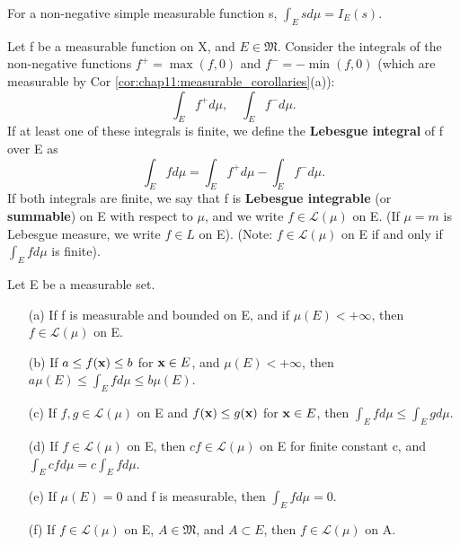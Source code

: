 \begin{remark}
  \label{rem:chap11:integral_simple_consistency}
  For a non-negative simple measurable function s, $\int_E s d\mu = I_E(s)$.
\end{remark}



\begin{definition}
  \label{def:chap11:integral_general}
  Let f be a measurable function on X, and $E \in \mathfrak{M}$.
  Consider the integrals of the non-negative functions $f^+ = \max(f,
  0)$ and $f^- = -\min(f, 0)$ (which are measurable by Cor
  \ref{cor:chap11:measurable_corollaries}(a)):
  \[
    \int_E f^+ d\mu, \quad \int_E f^- d\mu.
  \]
  If at least one of these integrals is finite, we define the
  \textbf{Lebesgue integral} of f over E as
  \[
    \int_E f d\mu = \int_E f^+ d\mu - \int_E f^- d\mu.
  \]
  If both integrals are finite, we say that f is \textbf{Lebesgue
  integrable} (or \textbf{summable}) on E with respect to $\mu$, and
  we write $f \in \mathcal{L}(\mu)$ on E. (If $\mu=m$ is Lebesgue
  measure, we write $f \in L$ on E).
  (Note: $f \in \mathcal{L}(\mu)$ on E if and only if $\int_E f d\mu$
  is finite).
\end{definition}

\begin{remark}
  \label{rem:chap11:integral_properties}
  Let E be a measurable set.
  \begin{itemize}
    \item[(a)] If f is measurable and bounded on E, and if $\mu(E) <
      +\infty$, then $f \in \mathcal{L}(\mu)$ on E.
    \item[(b)] If $a \le f(\mathbf{x}) \le b$ for $\mathbf{x} \in E$, and
      $\mu(E) < +\infty$, then $a\mu(E) \le \int_E f d\mu \le b\mu(E)$.
    \item[(c)] If $f, g \in \mathcal{L}(\mu)$ on E and $f(\mathbf{x})
      \le g(\mathbf{x})$ for $\mathbf{x} \in E$, then $\int_E f d\mu \le
      \int_E g d\mu$.
    \item[(d)] If $f \in \mathcal{L}(\mu)$ on E, then $cf \in
      \mathcal{L}(\mu)$ on E for finite constant c, and $\int_E cf
      d\mu = c \int_E f d\mu$.
    \item[(e)] If $\mu(E) = 0$ and f is measurable, then $\int_E f d\mu = 0$.
    \item[(f)] If $f \in \mathcal{L}(\mu)$ on E, $A \in
      \mathfrak{M}$, and $A \subset E$, then $f \in \mathcal{L}(\mu)$ on A.
  \end{itemize}
\end{remark}

